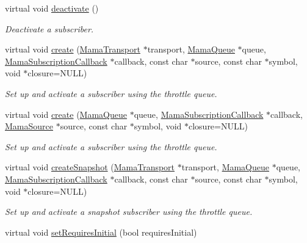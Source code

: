 \begin{DoxyCompactItemize}
virtual void \hyperlink{classWombat_1_1MamaSubscription_aa551169dd15b61496f6e6ef6974996e3}{deactivate} ()
\begin{DoxyCompactList}\small\item\em Deactivate a subscriber. \item\end{DoxyCompactList}\item 
virtual void \hyperlink{classWombat_1_1MamaSubscription_a2ac46ac833f5af07a09457c4eb778196}{create} (\hyperlink{classWombat_1_1MamaTransport}{MamaTransport} $\ast$transport, \hyperlink{classWombat_1_1MamaQueue}{MamaQueue} $\ast$queue, \hyperlink{classWombat_1_1MamaSubscriptionCallback}{MamaSubscriptionCallback} $\ast$callback, const char $\ast$source, const char $\ast$symbol, void $\ast$closure=NULL)
\begin{DoxyCompactList}\small\item\em Set up and activate a subscriber using the throttle queue. \item\end{DoxyCompactList}\item 
virtual void \hyperlink{classWombat_1_1MamaSubscription_a4c64dd1374448d285990fe754406899a}{create} (\hyperlink{classWombat_1_1MamaQueue}{MamaQueue} $\ast$queue, \hyperlink{classWombat_1_1MamaSubscriptionCallback}{MamaSubscriptionCallback} $\ast$callback, \hyperlink{classWombat_1_1MamaSource}{MamaSource} $\ast$source, const char $\ast$symbol, void $\ast$closure=NULL)
\begin{DoxyCompactList}\small\item\em Set up and activate a subscriber using the throttle queue. \item\end{DoxyCompactList}\item 
virtual void \hyperlink{classWombat_1_1MamaSubscription_a8a4dc0cdd12bbf92dfc12a6a13d2fa86}{createSnapshot} (\hyperlink{classWombat_1_1MamaTransport}{MamaTransport} $\ast$transport, \hyperlink{classWombat_1_1MamaQueue}{MamaQueue} $\ast$queue, \hyperlink{classWombat_1_1MamaSubscriptionCallback}{MamaSubscriptionCallback} $\ast$callback, const char $\ast$source, const char $\ast$symbol, void $\ast$closure=NULL)
\begin{DoxyCompactList}\small\item\em Set up and activate a snapshot subscriber using the throttle queue. \item\end{DoxyCompactList}\item 
virtual void \hyperlink{classWombat_1_1MamaSubscription_a5402b6243c4bf741d683fae088e8447b}{setRequiresInitial} (bool requiresInitial)

\end{DoxyCompactItemize}

